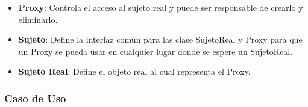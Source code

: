 \begin{itemize}
	\item \textbf{Proxy}: Controla el acceso al sujeto real y puede ser responsable de crearlo y eliminarlo.
	\item \textbf{Sujeto}: Define la interfaz común para las clase SujetoReal y Proxy para que un Proxy se pueda usar en cualquier lugar donde se espere un SujetoReal.
	\item \textbf{Sujeto Real}: Define el objeto real al cual representa el Proxy.
\end{itemize}


\subsubsection{Caso de Uso}


